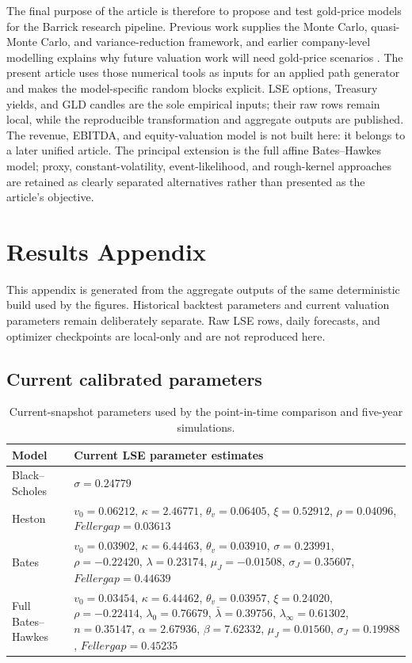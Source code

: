 \documentclass[a4paper,10pt,titlepage,oneside,openany]{book}
\theoremstyle{plain}
\theoremstyle{definition}
\theoremstyle{remark}
\begin{document}
The final purpose of the article is therefore to propose and test gold-price models for the Barrick research pipeline. Previous work supplies the Monte Carlo, quasi-Monte Carlo, and variance-reduction framework, and earlier company-level modelling explains why future valuation work will need gold-price scenarios \cite{BarrickArticle3,BarrickArticle4,BarrickArticle5}. The present article uses those numerical tools as inputs for an applied path generator and makes the model-specific random blocks explicit. LSE options, Treasury yields, and GLD candles are the sole empirical inputs; their raw rows remain local, while the reproducible transformation and aggregate outputs are published. The revenue, EBITDA, and equity-valuation model is not built here: it belongs to a later unified article. The principal extension is the full affine Bates--Hawkes model; proxy, constant-volatility, event-likelihood, and rough-kernel approaches are retained as clearly separated alternatives rather than presented as the article's objective.

\chapter*{Results Appendix}
{}

This appendix is generated from the aggregate outputs of the same deterministic build used by the figures. Historical backtest parameters and current valuation parameters remain deliberately separate. Raw LSE rows, daily forecasts, and optimizer checkpoints are local-only and are not reproduced here.

\section*{Current calibrated parameters}
\begin{table}[H]
\centering
\scriptsize
\setlength{\tabcolsep}{3pt}
\begin{tabularx}{\textwidth}{@{}p{2.8cm}X@{}}
\toprule
Model & Current LSE parameter estimates \\
\midrule
Black--Scholes & $\sigma=0.24779$ \\
Heston & $v_0=0.06212$, $\kappa=2.46771$, $\theta_v=0.06405$, $\xi=0.52912$, $\rho=0.04096$, $Feller gap=0.03613$ \\
Bates & $v_0=0.03902$, $\kappa=6.44463$, $\theta_v=0.03910$, $\sigma=0.23991$, $\rho=-0.22420$, $\lambda=0.23174$, $\mu_J=-0.01508$, $\sigma_J=0.35607$, $Feller gap=0.44639$ \\
Full Bates--Hawkes & $v_0=0.03454$, $\kappa=6.44462$, $\theta_v=0.03957$, $\xi=0.24020$, $\rho=-0.22414$, $\lambda_0=0.76679$, $\bar\lambda=0.39756$, $\lambda_\infty=0.61302$, $n=0.35147$, $\alpha=2.67936$, $\beta=7.62332$, $\mu_J=0.01560$, $\sigma_J=0.19988$, $Feller gap=0.45235$ \\
\bottomrule
\end{tabularx}
\caption{Current-snapshot parameters used by the point-in-time comparison and five-year simulations.}
\label{tab:appendix-current-parameters}
\end{table}
\end{document}
